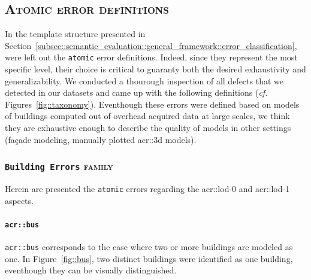     \subsection{\textsc{Atomic error definitions}}
        \label{subsec::semantic_evaluation::overhead::atomic}
        In the template structure presented in Section~\ref{subsec::semantic_evaluation::general_framework::error_classification}, were left out the \texttt{atomic} error definitions.
        Indeed, since they represent the most specific level, their choice is critical to guaranty both the desired exhaustivity and generalizability.
        We conducted a thourough inspection of all defects that we detected in our datasets and came up with the following definitions (\textit{cf.} Figures~\ref{fig::taxonomy}).
        Eventhough these errors were defined based on models of buildings computed out of overhead acquired data at large scales, we think they are exhaustive enough to describe the quality of models in other settings (fa\c{c}ade modeling, manually plotted \gls{acr::3d} models).

        \subsubsection{\texttt{Building Errors} \textsc{family}}
            Herein are presented the \texttt{atomic} errors regarding the \gls{acr::lod}-0 and \gls{acr::lod}-1 aspects.

            \paragraph{\texttt{\acrlong*{acr::bus}}}
                \texttt{\gls{acr::bus}} corresponds to the case where two or more buildings are modeled as one.
                In Figure~\ref{fig::bus}, two distinct buildings were identified as one building, eventhough they can be visually distinguished.\\

